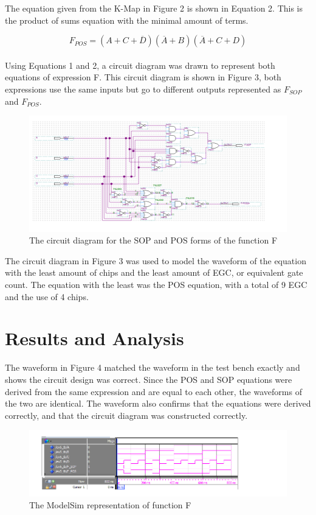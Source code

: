 \documentclass[CMPE]{KGCOEReport}
\begin{document}
The equation given from the K-Map in Figure 2 is shown in Equation 2. This is the product of sums equation with the minimal amount of terms.

\begin{equation} F_{POS} = (A + C + \overline{D})(\overline{A} + B)(\overline{A} + C + D) \end{equation}\\

Using Equations 1 and 2, a circuit diagram was drawn to represent both equations of expression F. This circuit diagram is shown in Figure 3, both expressions use the same inputs but go to different outputs represented as $F_{SOP}$ and $F_{POS}$.

\begin{figure}[H]
	\centering
	\includegraphics[width=1.00\textwidth]{QuartusL5}
	\caption{The circuit diagram for the SOP and POS forms of the function F}
	\label{fig:Figure 3}
\end{figure}

The circuit diagram in Figure 3 was used to model the waveform of the equation with the least amount of chips and the least amount of EGC, or equivalent gate count. The equation with the least was the POS equation, with a total of 9 EGC and the use of 4 chips.

\section*{Results and Analysis} 

The waveform in Figure 4 matched the waveform in the test bench exactly and shows the circuit design was correct. Since the POS and SOP equations were derived from the same expression and are equal to each other, the waveforms of the two are identical. The waveform also confirms that the equations were derived correctly, and that the circuit diagram was constructed correctly.

\begin{figure}[H]
	\centering 
	\includegraphics[width=1.20\textwidth]{ModelsimL5}
	\caption{The ModelSim representation of function F}
	\label{fig:Figure 4}
\end{figure}
 
\end{document}
